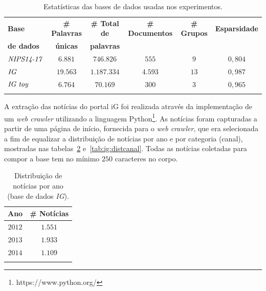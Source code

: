 \documentclass[
    12pt,                %
    oneside,            %
    a4paper,            %
    english,            %
    brazil                %
    ]{abntex2ppgsi}
\begin{document}
\begin{table}[h]
    \centering
    \caption{Estatísticas das bases de dados usadas nos experimentos.}
    \begin{tabular}{lccccc}
        \hline
        \textbf{Base}     & \textbf{\# Palavras} & \textbf{\# Total de} & \textbf{\# Documentos} & \textbf{\# Grupos} & \textbf{Esparsidade} \\
        \textbf{de dados} & \textbf{únicas}      & \textbf{palavras}    &               &           &             \\
        \hline
        $\text{\textit{NIPS14-17}}$ & $6.881$  & $746.826$   & $555$   & $9$  & $0,804$ \\
        $\text{\textit{IG}}$        & $19.563$ & $1.187.334$ & $4.593$ & $13$ & $0,987$ \\
        $\text{\textit{IG toy}}$    & $6.764$  & $70.169$    & $300$   & $3$  & $0,965$ \\
        \hline
        & & & & & \\
        \end{tabular}
    \label{tab:datasetsstatsREAL}
\end{table}

A extração das notícias do portal iG foi realizada através da implementação de um \textit{web crawler} utilizando a linguagem Python\footnote{https://www.python.org/}.
As notícias foram capturadas a partir de uma página de início, fornecida para o \textit{web crawler}, que era selecionada a fim de equalizar a distribuição de notícias por ano e por categoria (canal), mostradas nas tabelas~\ref{tab:ig:distano} e~\ref{tab:ig:distcanal}.
Todas as notícias coletadas para compor a base tem no mínimo $250$ caracteres no corpo.

\begin{table}[h]
\centering
\caption{Distribuição de notícias por ano (base de dados \textit{IG}).}
    \begin{tabular}{cc}
        \hline
        Ano & \# Notícias \\
        \hline
        $2012$ & $1.551$ \\
        $2013$ & $1.933$ \\
        $2014$ & $1.109$ \\
        \hline
        & \\
    \end{tabular}
    \label{tab:ig:distano}
\end{table}
\end{document}

